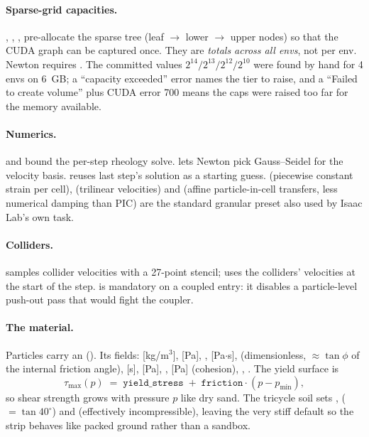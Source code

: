 \paragraph{Sparse-grid capacities.}
, ,
,  pre-allocate the
sparse tree (leaf $\to$ lower $\to$ upper nodes) so that the CUDA graph can
be captured once. They are \emph{totals across all envs}, not per env. Newton
requires . The committed values
$2^{14}/2^{13}/2^{12}/2^{10}$ were found by hand for 4 envs on 6~GB; a
``capacity exceeded'' error names the tier to raise, and a
``Failed to create volume'' plus CUDA error 700 means the caps were raised
too far for the memory available.

\paragraph{Numerics.}
 and  bound the per-step
rheology solve.  lets Newton pick Gauss--Seidel for the
 velocity basis.  reuses last step's
solution as a starting guess.  (piecewise constant
strain per cell),  (trilinear velocities) and
 (affine particle-in-cell transfers, less
numerical damping than PIC) are the standard granular preset also used by
Isaac Lab's own  task.

\paragraph{Colliders.}
 samples collider velocities with a 27-point
stencil;  uses the colliders'
velocities at the start of the step. 
is mandatory on a coupled entry: it disables a particle-level push-out pass
that would fight the coupler.

\paragraph{The material.}
Particles carry an 
(). Its fields: 
[kg/m$^3$],  [Pa], ,
 [Pa$\cdot$s],  (dimensionless, $\approx
\tan\phi$ of the internal friction angle),  [s],
 [Pa], , 
[Pa] (cohesion), , . The yield surface is
\[
  \tau_{\max}(p) \;=\; \texttt{yield\_stress} \;+\; \texttt{friction}\cdot(p - p_{\min}),
\]
so shear strength grows with pressure $p$ like dry sand. The tricycle soil
sets ,  ($=\tan 40^\circ$) and
 (effectively incompressible), leaving the very
stiff default  so the strip behaves like packed ground
rather than a sandbox.

